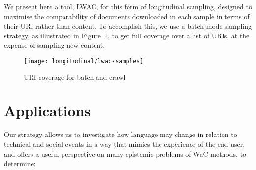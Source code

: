 % 
% 


We present here a tool, LWAC, for this form of longitudinal sampling, designed to maximise the comparability of documents downloaded in each sample in terms of their URI rather than content.  To accomplish this, we use a batch-mode sampling strategy, as illustrated in Figure~\ref{fig:longitudinal:lwac:samples}, to get full coverage over a list of URIs, at the expense of sampling new content.

\begin{figure}[Ht]
    \centering
    \texttt{[image: longitudinal/lwac-samples]}
    \caption{URI coverage for batch and crawl}
    \label{fig:longitudinal:lwac:samples}
\end{figure}



\section{Applications}
Our strategy allows us to investigate how language may change in relation to technical and social events in a way that mimics the experience of the end user, and offers a useful perspective on many epistemic problems of WaC methods, to determine:

